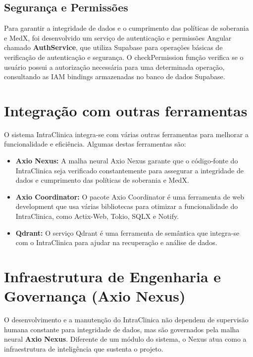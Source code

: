 \subsection{Segurança e Permissões}

Para garantir a integridade de dados e o cumprimento das políticas de soberania e MedX, foi desenvolvido um serviço de autenticação e permissões Angular chamado \textbf{AuthService}, que utiliza Supabase para operações básicas de verificação de autenticação e segurança. O checkPermission função verifica se o usuário possui a autorização necessária para uma determinada operação, consultando as IAM bindings armazenadas no banco de dados Supabase.

\section{Integração com outras ferramentas}

O sistema IntraClinica integra-se com várias outras ferramentas para melhorar a funcionalidade e eficiência. Algumas destas ferramentas são:
\begin{itemize}
    \item \textbf{Axio Nexus:} A malha neural Axio Nexus garante que o código-fonte do IntraClinica seja verificado constantemente para assegurar a integridade de dados e cumprimento das políticas de soberania e MedX.
    \item \textbf{Axio Coordinator:} O pacote Axio Coordinator é uma ferramenta de web development que usa várias bibliotecas para otimizar a funcionalidade do IntraClinica, como Actix-Web, Tokio, SQLX e Notify.
    \item \textbf{Qdrant:} O serviço Qdrant é uma ferramenta de semântica que integra-se com o IntraClinica para ajudar na recuperação e análise de dados.
\end{itemize}

\section{Infraestrutura de Engenharia e Governança (Axio Nexus)}

O desenvolvimento e a manutenção do IntraClinica não dependem de supervisão humana constante para integridade de dados, mas são governados pela malha neural \textbf{Axio Nexus}. Diferente de um módulo do sistema, o Nexus atua como a infraestrutura de inteligência que sustenta o projeto.

